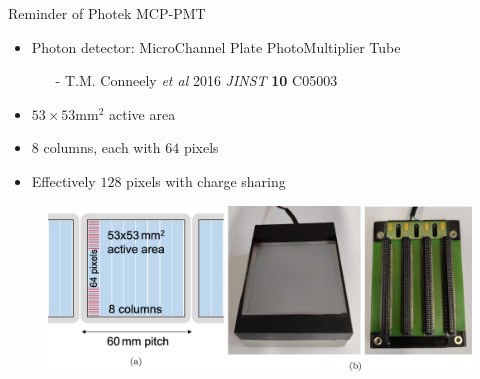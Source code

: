 \documentclass[xcolor={dvipsnames}]{beamer}
\begin{document}
\begin{frame}{Reminder of Photek MCP-PMT}
  \begin{itemize}
    \setlength\itemsep{0.7em}
    \item{Photon detector: MicroChannel Plate PhotoMultiplier Tube}
    \begin{itemize}
      \item[-]{T.M. Conneely \textit{et al} 2016 \textit{JINST} \textbf{10} C05003}
    \end{itemize}
    \item{$53\times 53\si{\milli\meter\squared}$ active area}
    \item{$8$ columns, each with $64$ pixels}
    \item{Effectively $128$ pixels with charge sharing}
  \end{itemize}
  \begin{figure}
    \centering
    \includegraphics[width = 1.0\textwidth,trim={0 0.5cm 0 0},clip=true]{Figs/TORCH_testbeam_2018_MCPPMT.jpg}
  \end{figure}
\end{frame}
\end{document}
